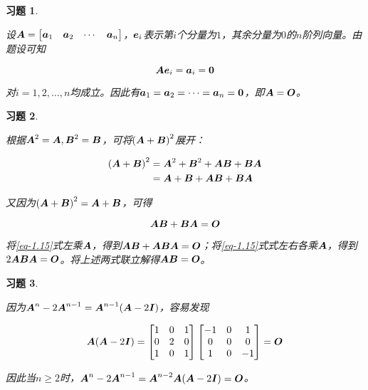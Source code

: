 \documentclass{ctexart}
\newtheorem{problem}{习题}[section]
\begin{document}
\begin{problem}\

设\(\mata=\begin{bmatrix}\veca_1&\veca_2&\cdots&\veca_n\end{bmatrix}\)，\(\vece_i\)表示第\(i\)个分量为\(1\)，其余分量为\(0\)的\(n\)阶列向量。由题设可知

\begin{equation*}
    \mata\vece_i=\veca_i=\veczero
\end{equation*}

对\(i=1,2,\dots,n\)均成立。因此有\(\veca_1=\veca_2=\cdots=\veca_n=\veczero\)，即\(\mata=\mato\)。

\end{problem}

\begin{problem}\

根据\(\mata^2=\mata,\matb^2=\matb\)，可将\(\mypar{\mata+\matb}^2\)展开：

\begin{align*}
    \mypar{\mata+\matb}^2 & =\mata^2+\matb^2+\mata\matb+\matb\mata \\
                          & =\mata+\matb+\mata\matb+\matb\mata
\end{align*}

又因为\(\mypar{\mata+\matb}^2=\mata+\matb\)，可得

\begin{equation}\label{eq-1.15}
    \mata\matb+\matb\mata=\mato
\end{equation}

将\eqref{eq-1.15}式左乘\(\mata\)，得到\(\mata\matb+\mata\matb\mata=\mato\)；将\eqref{eq-1.15}式式左右各乘\(\mata\)，得到\(2\mata\matb\mata=\mato\)。将上述两式联立解得\(\mata\matb=\mato\)。

\end{problem}

\begin{problem}\

因为\(\mata^n-2\mata^{n-1}=\mata^{n-1}(\mata-2\mati)\)，容易发现

\begin{equation*}
    \mata(\mata-2\mati)=
    \begin{bmatrix}
        1 & 0 & 1 \\0&2&0\\1&0&1
    \end{bmatrix}
    \begin{bmatrix}
        -1 & 0 & 1 \\0&0&0\\1&0&-1
    \end{bmatrix}=\mato
\end{equation*}

因此当\(n\ge2\)时，\(\mata^n-2\mata^{n-1}=\mata^{n-2}\mata(\mata-2\mati)=\mato\)。

\end{problem}
\end{document}
